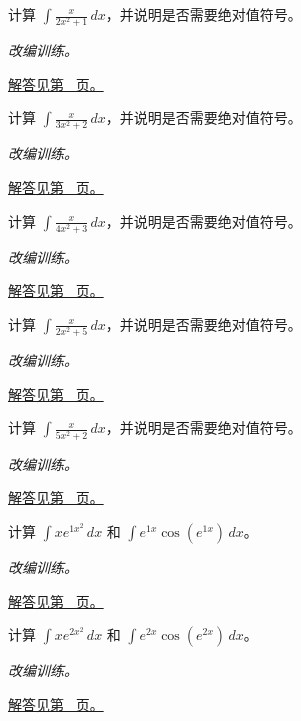 \documentclass[UTF8,12pt,a4paper,fontset=fandol]{ctexart}
\begin{document}
\begin{example}[分母导数型积分]\label{ex:c12q8}
计算 $\displaystyle\int\frac{x}{2x^2+1}\,dx$，并说明是否需要绝对值符号。
\par\textit{改编训练。}\par\hyperref[ans:c12q8]{解答见第~\pageref{ans:c12q8} 页。}
\end{example}
\begin{example}[分母导数型积分]\label{ex:c12q9}
计算 $\displaystyle\int\frac{x}{3x^2+2}\,dx$，并说明是否需要绝对值符号。
\par\textit{改编训练。}\par\hyperref[ans:c12q9]{解答见第~\pageref{ans:c12q9} 页。}
\end{example}
\begin{example}[分母导数型积分]\label{ex:c12q10}
计算 $\displaystyle\int\frac{x}{4x^2+3}\,dx$，并说明是否需要绝对值符号。
\par\textit{改编训练。}\par\hyperref[ans:c12q10]{解答见第~\pageref{ans:c12q10} 页。}
\end{example}
\begin{example}[分母导数型积分]\label{ex:c12q11}
计算 $\displaystyle\int\frac{x}{2x^2+5}\,dx$，并说明是否需要绝对值符号。
\par\textit{改编训练。}\par\hyperref[ans:c12q11]{解答见第~\pageref{ans:c12q11} 页。}
\end{example}
\begin{example}[分母导数型积分]\label{ex:c12q12}
计算 $\displaystyle\int\frac{x}{5x^2+2}\,dx$，并说明是否需要绝对值符号。
\par\textit{改编训练。}\par\hyperref[ans:c12q12]{解答见第~\pageref{ans:c12q12} 页。}
\end{example}
\begin{example}[指数复合的反向链式法则]\label{ex:c12q13}
计算 $\displaystyle\int x e^{1x^2}\,dx$ 和 $\displaystyle\int e^{1x}\cos(e^{1x})\,dx$。
\par\textit{改编训练。}\par\hyperref[ans:c12q13]{解答见第~\pageref{ans:c12q13} 页。}
\end{example}
\begin{example}[指数复合的反向链式法则]\label{ex:c12q14}
计算 $\displaystyle\int x e^{2x^2}\,dx$ 和 $\displaystyle\int e^{2x}\cos(e^{2x})\,dx$。
\par\textit{改编训练。}\par\hyperref[ans:c12q14]{解答见第~\pageref{ans:c12q14} 页。}
\end{example}
\end{document}
